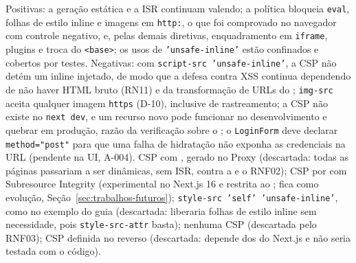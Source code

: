 {Positivas: a geração estática e a ISR continuam valendo; a política bloqueia \texttt{eval}, folhas de estilo inline e imagens em \texttt{http:}, o que foi comprovado no navegador com controle negativo, e, pelas demais diretivas, enquadramento em \texttt{iframe}, plugins e troca do \texttt{<base>}; os usos de \texttt{'unsafe-inline'} estão confinados e cobertos por testes. Negativas: com \texttt{script-src 'unsafe-inline'}, a CSP não detém um  inline injetado, de modo que a defesa contra XSS continua dependendo de não haver HTML bruto (RN11) e da transformação de URLs do ; \texttt{img-src} aceita qualquer imagem \texttt{https} (D-10), inclusive de rastreamento; a CSP não existe no \texttt{next dev}, e um recurso novo pode funcionar no desenvolvimento e quebrar em produção, razão da verificação sobre o ; o \texttt{LoginForm} deve declarar \texttt{method="post"} para que uma falha de hidratação não exponha as credenciais na URL (pendente na UI, A-004).}
{CSP com , gerado no Proxy (descartada: todas as páginas passariam a ser dinâmicas, sem ISR, contra a  e o RNF02); CSP por  com Subresource Integrity (experimental no Next.js 16 e restrita ao ; fica como evolução, Seção~\ref{sec:trabalhos-futuros}); \texttt{style-src 'self' 'unsafe-inline'}, como no exemplo do guia (descartada: liberaria folhas de estilo inline sem necessidade, pois \texttt{style-src-attr} basta); nenhuma CSP (descartada pelo RNF03); CSP definida no  reverso (descartada: depende dos  do Next.js e não seria testada com o código).}

